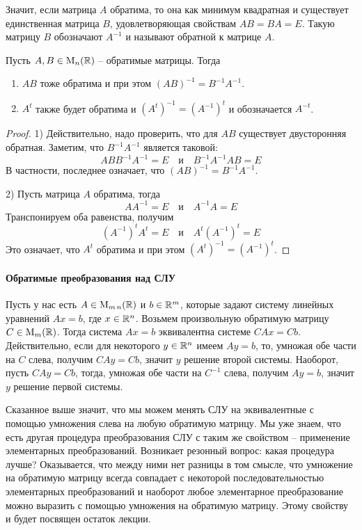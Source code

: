 Значит, если матрица $A$ обратима, то она как минимум квадратная и существует единственная матрица $B$, удовлетворяющая свойствам $AB = BA = E$.
Такую матрицу $B$ обозначают $A^{-1}$ и называют обратной к матрице $A$.

\begin{claim}
Пусть $A, B\in \operatorname{M}_{n}(\mathbb R)$ -- обратимые матрицы.
Тогда 
\begin{enumerate}
\item $AB$ тоже обратима и при этом $(AB)^{-1} = B^{-1}A^{-1}$.

\item  $A^t$ также будет обратима и $(A^t)^{-1} = (A^{-1})^t$ и обозначается $A^{-t}$.
\end{enumerate}
\end{claim}
\begin{proof}
1) Действительно, надо проверить, что для $AB$ существует двусторонняя обратная.
Заметим, что $B^{-1}A^{-1}$ является таковой:
\[
AB B^{-1}A^{-1} = E \quad\text{и}\quad B^{-1}A^{-1} AB = E
\]
В частности, последнее означает, что $(AB)^{-1} = B^{-1}A^{-1}$.

2) Пусть матрица $A$ обратима, тогда
\[
A A^{-1} = E\quad \text{и}\quad A^{-1}A = E
\]
Транспонируем оба равенства, получим
\[
(A^{-1})^t A^t = E\quad \text{и}\quad A^t (A^{-1})^t = E
\]
Это означает, что $A^t$ обратима и при этом $(A^t)^{-1} = (A^{-1})^t$.
\end{proof}

\paragraph{Обратимые преобразования над СЛУ} 


Пусть у нас есть $A\in\operatorname{M}_{m\,n}(\mathbb R)$ и $b\in \mathbb R^{m}$, которые задают систему линейных уравнений $Ax = b$, где $x\in \mathbb R^{n}$.
Возьмем произвольную обратимую матрицу $C\in\operatorname{M}_{m}(\mathbb R)$.
Тогда система $Ax = b$ эквивалентна системе $CAx = Cb$.
Действительно, если для некоторого $y\in\mathbb R^{n}$ имеем $Ay = b$, то, умножая обе части на $C$ слева, получим $CAy = Cb$, значит $y$ решение второй системы.
Наоборот, пусть $CA y = Cb$, тогда, умножая обе части на $C^{-1}$ слева, получим $Ay =b$, значит $y$ решение первой системы.

Сказанное выше значит, что мы можем менять СЛУ на эквивалентные с помощью умножения слева на любую обратимую матрицу.
Мы уже знаем, что есть другая процедура преобразования СЛУ с таким же свойством -- применение элементарных преобразований.
Возникает резонный вопрос: какая процедура лучше?
Оказывается, что между ними нет разницы в том смысле, что умножение на обратимую матрицу всегда совпадает с некоторой последовательностью элементарных преобразований и наоборот любое элементарное преобразование можно выразить с помощью умножения на обратимую матрицу.
Этому свойству и будет посвящен остаток лекции.

